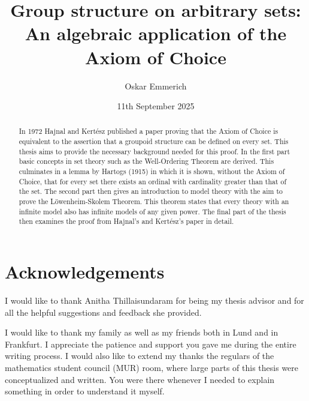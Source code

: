 \documentclass[a4paper,12pt]{memoir}
\numberwithin{equation}{section} %
\theoremstyle{plain} %
\theoremstyle{definition} %
\theoremstyle{remark} %
\begin{document}



\author{Oskar Emmerich}

\title{Group structure on arbitrary sets:\\An algebraic application of the Axiom of Choice}

\date{11th September 2025}



\frontmatter %


\thispagestyle{empty}

\begin{abstract}
  In 1972 Hajnal and Kertész published a paper proving that the Axiom of Choice is equivalent to the assertion that a groupoid structure can be defined on every set.
  This thesis aims to provide the necessary background needed for this proof.
  In the first part basic concepts in set theory such as the Well-Ordering Theorem are derived. 
  This culminates in a lemma by Hartogs (1915) in which it is shown, without the Axiom of Choice, that for every set there exists an ordinal with cardinality greater than that of the set.
  The second part then gives an introduction to model theory with the aim to prove the Löwenheim-Skolem Theorem.
  This theorem states that every theory with an infinite model also has infinite models of any given power.
  The final part of the thesis then examines the proof from Hajnal's and Kertész's paper in detail.
\end{abstract}



\chapter*{Acknowledgements}
I would like to thank Anitha Thillaisundaram for being my thesis advisor and for all the helpful suggestions and feedback she provided.

I would like to thank my family as well as my friends both in Lund and in Frankfurt. 
I appreciate the patience and support you gave me during the entire writing process.
I would also like to extend my thanks the regulars of the mathematics student council (MUR) room, where large parts of this thesis were conceptualized and written.
You were there whenever I needed to explain something in order to understand it myself.
\end{document}
